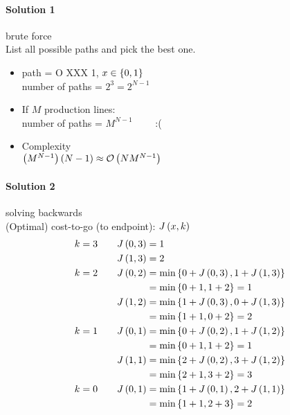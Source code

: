 \paragraph{Solution 1} brute force\\
List all possible paths and pick the best one.\\
\begin{itemize}
    \item path = O XXX 1, $x \in \left\lbrace 0,1 \right\rbrace$\\
        number of paths = $2^3=2^{N-1}$\\
    \item If $M$ production lines:\\
        number of paths = $M^{N-1} \qquad$ :(\\
    \item Complexity\\
    $\left( M^{N-1} \right)\left( N-1 \right)
    \approx \mathcal{O}\left( NM^{N-1} \right)$ 
\end{itemize}

\paragraph{Solution 2} solving backwards\\
(Optimal) cost-to-go (to endpoint): $J \left( x,k \right)$
\begin{align*}
k=3 \qquad
    J \left( 0,3 \right) &= 1\\
    J \left( 1,3 \right) &= 2\\
k=2 \qquad
    J \left( 0,2 \right)  &= \min \left\lbrace 0 + J \left( 0,3 \right), 1 + J \left( 1,3 \right) \right\rbrace\\
                &= \min \left\lbrace 0+1, 1+2 \right\rbrace = 1\\
    J \left( 1,2 \right)  &= \min \left\lbrace 1 + J \left( 0,3 \right), 0 + J \left( 1,3 \right) \right\rbrace\\
                &= \min \left\lbrace 1+1, 0+2 \right\rbrace = 2\\
k=1 \qquad
    J \left( 0,1 \right)  &= \min \left\lbrace 0 + J \left( 0,2 \right), 1 + J \left( 1,2 \right) \right\rbrace\\
                &= \min \left\lbrace 0+1, 1+2 \right\rbrace = 1\\
    J \left( 1,1 \right)  &= \min \left\lbrace 2 + J \left( 0,2 \right), 3 + J \left( 1,2 \right) \right\rbrace\\
                &= \min \left\lbrace 2+1, 3+2 \right\rbrace = 3\\
k=0 \qquad
    J \left( 0,1 \right)  &= \min \left\lbrace 1 + J \left( 0,1 \right), 2 + J \left( 1,1 \right) \right\rbrace\\
                &= \min \left\lbrace 1+1, 2+3 \right\rbrace = 2\\
\end{align*}

